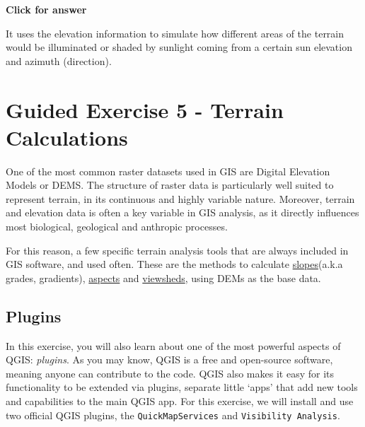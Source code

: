 \documentclass[
  letterpaper,
  DIV=11,
  numbers=noendperiod]{scrreprt}
\begin{document}
\begin{tcolorbox}[enhanced jigsaw, toprule=.15mm, breakable, left=2mm, colframe=quarto-callout-important-color-frame, colback=white, arc=.35mm, leftrule=.75mm, opacityback=0, rightrule=.15mm, bottomrule=.15mm]

\vspace{-3mm}\textbf{Click for answer}\vspace{3mm}

It uses the elevation information to simulate how different areas of the
terrain would be illuminated or shaded by sunlight coming from a certain
sun elevation and azimuth (direction).

\end{tcolorbox}

\section{Guided Exercise 5 - Terrain
Calculations}\label{guided-exercise-5---terrain-calculations}

One of the most common raster datasets used in GIS are Digital Elevation
Models or DEMS. The structure of raster data is particularly well suited
to represent terrain, in its continuous and highly variable nature.
Moreover, terrain and elevation data is often a key variable in GIS
analysis, as it directly influences most biological, geological and
anthropic processes.

For this reason, a few specific terrain analysis tools that are always
included in GIS software, and used often. These are the methods to
calculate
\href{https://en.wikipedia.org/wiki/Grade_(slope)}{slopes}(a.k.a grades,
gradients),
\href{https://en.wikipedia.org/wiki/Aspect_(geography)}{aspects} and
\href{https://en.wikipedia.org/wiki/Viewshed}{viewsheds}, using DEMs as
the base data.

\subsection{Plugins}\label{plugins}

In this exercise, you will also learn about one of the most powerful
aspects of QGIS: \emph{plugins}. As you may know, QGIS is a free and
open-source software, meaning anyone can contribute to the code. QGIS
also makes it easy for its functionality to be extended via plugins,
separate little `apps' that add new tools and capabilities to the main
QGIS app. For this exercise, we will install and use two official QGIS
plugins, the \texttt{QuickMapServices} and
\texttt{Visibility\ Analysis}.
\end{document}
